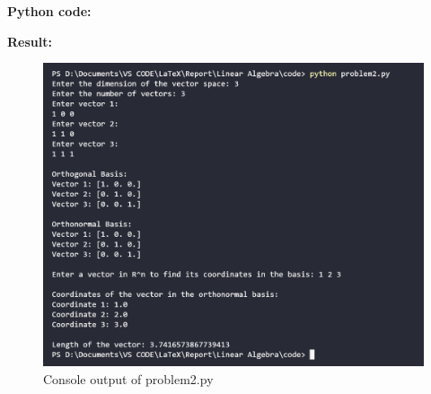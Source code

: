 \clearpage

\textbf{Python code:}


\clearpage

\textbf{Result:}
\begin{figure}[H]
    \centering
    \includegraphics[width=16cm]{graphics/2.png}
    \caption{Console output of problem2.py}
\end{figure}

